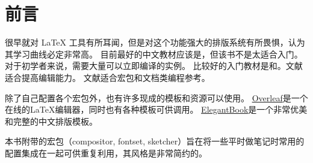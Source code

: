 \chapter{前言}

很早就对 {\LaTeX} 工具有所耳闻，但是对这个功能强大的排版系统有所畏惧，认为其学习曲线必定非常高。
目前最好的中文教材应该是\cite{LIU13}，但该书不是太适合入门。 对于初学者来说，需要大量可以立即编译的实例。 
比较好的入门教材是\cite{GUIDE}和\cite{COOKBOOK}。文献\cite{COMPANION}适合提高编辑能力。
文献\cite{CLSGUIDE}适合宏包和文档类编程参考。

除了自己配置各个宏包外，也有许多现成的模板和资源可以使用。
\href{https://www.overleaf.com}{Overleaf}是一个在线的{\LaTeX}编辑器，同时也有各种模板可供调用。
\href{https://github.com/ElegantLaTeX/ElegantBook}{ElegantBook}是一个非常优美和完整的中文排版模板。

本书附带的宏包（compositor, fontset, sketcher）旨在将一些平时做笔记时常用的配置集成在一起可供重复利用，其风格是非常简约的。
